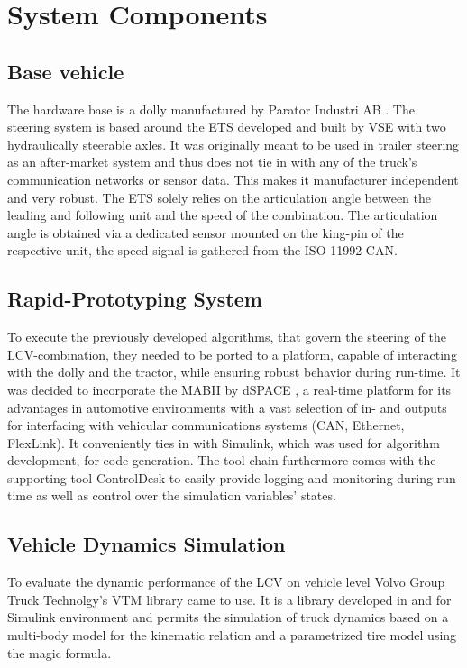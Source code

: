 \documentclass[root.tex]{subfiles}
\begin{document}
{\pagestyle{empty}}
\section{System Components}
\label{chap:Hardware-Setup}
\subsection{Base vehicle}
\label{sec:basevehicle}

The hardware base is a dolly manufactured by Parator Industri AB \cite{paratorAB}. The steering system is based around the \gls{ETS} developed and built by \gls{VSE} \cite{vse} with two hydraulically steerable axles. It was originally meant to be used in trailer steering as an after-market system and thus does not tie in with any of the truck's communication networks or sensor data. This makes it manufacturer independent and very robust. The \gls{ETS} solely relies on the articulation angle between the leading and following unit and the speed of the combination. The articulation angle is obtained via a dedicated sensor mounted on the king-pin of the respective unit, the speed-signal is gathered from the ISO-11992 \gls{CAN}. 

\subsection{Rapid-Prototyping System}

To execute the previously developed algorithms, that govern the steering of the \gls{LCV}-combination, they needed to be ported to a platform, capable of interacting with the dolly and the tractor, while ensuring robust behavior during run-time. It was decided to incorporate the \gls{MABII} \cite{mabii} by dSPACE \cite{dspace}, a real-time platform for its advantages in automotive environments with a vast selection of in- and outputs for interfacing with vehicular communications systems (\gls{CAN}, Ethernet, FlexLink). It conveniently ties in with Simulink, which was used for algorithm development, for code-generation. %
 The tool-chain furthermore comes with the supporting tool ControlDesk to easily provide logging and monitoring during run-time as well as control over the simulation variables' states.


\subsection{Vehicle Dynamics Simulation}
To evaluate the dynamic performance of the \gls{LCV} on vehicle level Volvo Group Truck Technolgy's \gls{VTM} \cite{vtm_source} library came to use. It is a library developed in and for Simulink environment and permits the simulation of truck dynamics based on a multi-body model for the kinematic relation and a parametrized tire model using the magic formula.
\end{document}
